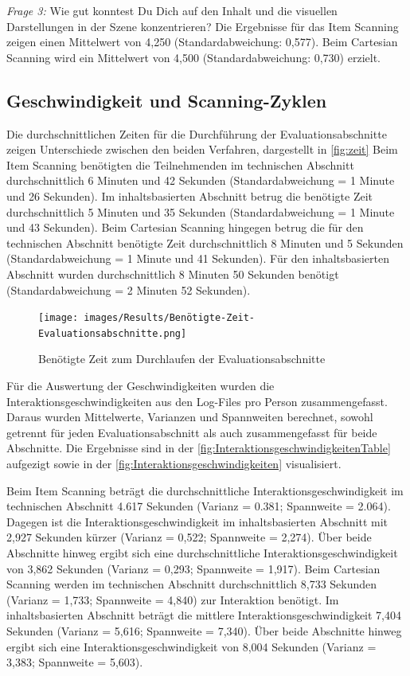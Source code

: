 \textit{Frage 3:} Wie gut konntest Du Dich auf den Inhalt und die visuellen Darstellungen in der Szene konzentrieren?
Die Ergebnisse für das Item Scanning zeigen einen Mittelwert von 4,250 (Standardabweichung: 0,577). Beim Cartesian Scanning wird ein Mittelwert von 4,500 (Standardabweichung: 0,730) erzielt.

\subsection{Geschwindigkeit und Scanning-Zyklen}

Die durchschnittlichen Zeiten für die Durchführung der Evaluationsabschnitte zeigen Unterschiede zwischen den beiden Verfahren, dargestellt in \autoref{fig:zeit} Beim Item Scanning benötigten die Teilnehmenden im technischen Abschnitt durchschnittlich 6 Minuten und 42 Sekunden (Standardabweichung = 1 Minute und 26 Sekunden). Im inhaltsbasierten Abschnitt betrug die benötigte Zeit durchschnittlich 5 Minuten und 35 Sekunden (Standardabweichung = 1 Minute und 43 Sekunden).
Beim Cartesian Scanning hingegen betrug die für den technischen Abschnitt benötigte Zeit durchschnittlich 8 Minuten und 5 Sekunden (Standardabweichung = 1 Minute und 41 Sekunden). Für den inhaltsbasierten Abschnitt wurden durchschnittlich 8 Minuten 50 Sekunden benötigt (Standardabweichung = 2 Minuten 52 Sekunden).

\begin{figure}[tbh]
    \centering
    \texttt{[image: images/Results/Benötigte-Zeit-Evaluationsabschnitte.png]}
    \caption{Benötigte Zeit zum Durchlaufen der Evaluationsabschnitte}
    \label{fig:zeit}
\end{figure}

Für die Auswertung der Geschwindigkeiten wurden die Interaktionsgeschwindigkeiten aus den Log-Files pro Person zusammengefasst. Daraus wurden Mittelwerte, Varianzen und Spannweiten berechnet, sowohl getrennt für jeden Evaluationsabschnitt als auch zusammengefasst für beide Abschnitte. Die Ergebnisse sind in der \autoref{fig:InteraktionsgeschwindigkeitenTable} aufgezigt sowie in der \autoref{fig:Interaktionsgeschwindigkeiten} visualisiert. 

Beim Item Scanning beträgt die durchschnittliche Interaktionsgeschwindigkeit im technischen Abschnitt 4.617 Sekunden (Varianz = 0.381; Spannweite = 2.064). Dagegen ist die Interaktionsgeschwindigkeit im inhaltsbasierten Abschnitt mit 2,927 Sekunden kürzer (Varianz = 0,522; Spannweite = 2,274). Über beide Abschnitte hinweg ergibt sich eine durchschnittliche Interaktionsgeschwindigkeit von 3,862 Sekunden (Varianz = 0,293; Spannweite = 1,917).
Beim Cartesian Scanning werden im technischen Abschnitt durchschnittlich 8,733 Sekunden (Varianz = 1,733; Spannweite = 4,840) zur Interaktion benötigt. Im inhaltsbasierten Abschnitt beträgt die mittlere Interaktionsgeschwindigkeit 7,404 Sekunden (Varianz = 5,616; Spannweite = 7,340). Über beide Abschnitte hinweg ergibt sich eine Interaktionsgeschwindigkeit von 8,004 Sekunden (Varianz = 3,383; Spannweite = 5,603).

